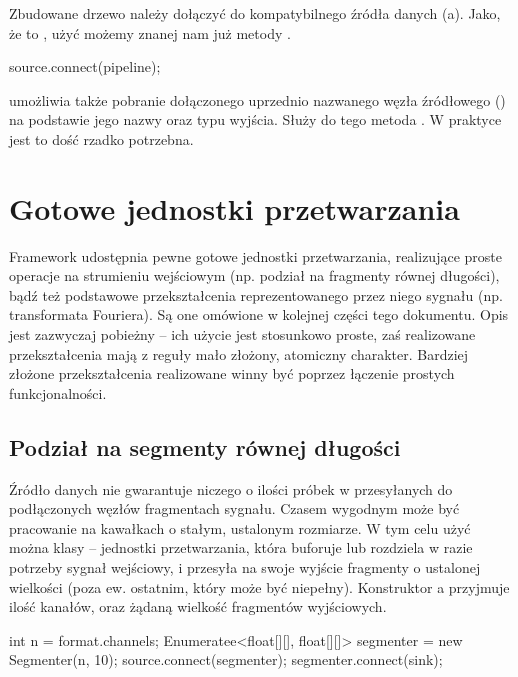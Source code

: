 Zbudowane drzewo należy dołączyć do kompatybilnego źródła danych (a). Jako, że
 to , użyć możemy znanej nam już metody .

\begin{java}
source.connect(pipeline);
\end{java}

 umożliwia także pobranie dołączonego uprzednio nazwanego węzła źródłowego
() na podstawie jego nazwy oraz typu wyjścia. Służy do tego metoda
. W praktyce jest to dość rzadko potrzebna.


\section{Gotowe jednostki przetwarzania}
\label{Jednostki}

Framework udostępnia pewne gotowe jednostki przetwarzania, realizujące proste operacje na strumieniu
wejściowym (np. podział na fragmenty równej długości), bądź też podstawowe przekształcenia
reprezentowanego przez niego sygnału (np. transformata Fouriera). Są one omówione w kolejnej części
tego dokumentu. Opis jest zazwyczaj pobieżny -- ich użycie jest stosunkowo proste, zaś realizowane
przekształcenia mają z reguły mało złożony, atomiczny charakter. Bardziej złożone przekształcenia
realizowane winny być poprzez łączenie prostych funkcjonalności.


\subsection{Podział na segmenty równej długości}

Źródło danych nie gwarantuje niczego o ilości próbek w przesyłanych do podłączonych węzłów
fragmentach sygnału. Czasem wygodnym może być pracowanie na kawałkach o stałym, ustalonym rozmiarze.
W tym celu użyć można klasy  -- jednostki przetwarzania, która buforuje lub
rozdziela w razie potrzeby sygnał wejściowy, i przesyła na swoje wyjście fragmenty o ustalonej
wielkości (poza ew. ostatnim, który może być niepełny). Konstruktor a przyjmuje
ilość kanałów, oraz żądaną wielkość fragmentów wyjściowych.

\begin{java}
int n = format.channels;
Enumeratee<float[][], float[][]> segmenter = new Segmenter(n, 10);
source.connect(segmenter);
segmenter.connect(sink);
\end{java}


